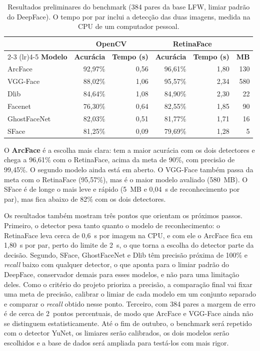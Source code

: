 \documentclass[
    12pt,
    oneside,
    a4paper,
    article,
    english,
    brazil
    ]{abntex2}
\begin{document}
\begin{table}[H]
\centering
\caption{Resultados preliminares do benchmark (384 pares da base LFW, limiar padrão do DeepFace). O tempo por par inclui a detecção das duas imagens, medida na CPU de um computador pessoal.}
\label{tab:benchmark}
\begin{tabular}{lrrrrr}
    \toprule
     & \multicolumn{2}{c}{\textbf{OpenCV}} & \multicolumn{2}{c}{\textbf{RetinaFace}} & \\
    \cmidrule(lr){2-3} \cmidrule(lr){4-5}
    \textbf{Modelo} & \textbf{Acurácia} & \textbf{Tempo (s)} & \textbf{Acurácia} & \textbf{Tempo (s)} & \textbf{MB} \\
    \midrule
    ArcFace      & 92,97\% & 0,56 & 96,61\% & 1,80 & 130 \\
    VGG-Face     & 88,02\% & 1,06 & 95,57\% & 2,34 & 580 \\
    Dlib         & 84,64\% & 1,08 & 84,90\% & 2,30 & 22 \\
    Facenet      & 76,30\% & 0,64 & 82,55\% & 1,85 & 90 \\
    GhostFaceNet & 82,03\% & 0,51 & 81,77\% & 1,71 & 16 \\
    SFace        & 81,25\% & 0,09 & 79,69\% & 1,28 & 5 \\
    \bottomrule
\end{tabular}
\end{table}

O \textbf{ArcFace} é a escolha mais clara: tem a maior acurácia com os dois
detectores e chega a 96,61\% com o RetinaFace, acima da meta de 90\%, com
precisão de 99,45\%. O segundo modelo ainda está em aberto. O VGG-Face também
passa da meta com o RetinaFace (95,57\%), mas é o maior modelo avaliado
(580~MB). O SFace é de longe o mais leve e rápido (5~MB e 0,04~s de
reconhecimento por par), mas fica abaixo de 82\% com os dois detectores.

Os resultados também mostram três pontos que orientam os próximos passos.
Primeiro, o detector pesa tanto quanto o modelo de reconhecimento: o
RetinaFace leva cerca de 0,6~s por imagem na CPU, e com ele o ArcFace fica em
1,80~s por par, perto do limite de 2~s, o que torna a escolha do detector
parte da decisão. Segundo, SFace, GhostFaceNet e Dlib têm precisão próxima de
100\% e \textit{recall} baixo com qualquer detector, o que aponta para o
limiar padrão do DeepFace, conservador demais para esses modelos, e não para
uma limitação deles. Como o critério do projeto prioriza a precisão, a
comparação final vai fixar uma meta de precisão, calibrar o limiar de cada
modelo em um conjunto separado e comparar o \textit{recall} obtido nesse
ponto. Terceiro, com 384 pares a margem de erro é de cerca de 2~pontos
percentuais, de modo que ArcFace e VGG-Face ainda não se distinguem
estatisticamente. Até o fim de outubro, o benchmark será repetido com o
detector YuNet, os limiares serão calibrados, os dois modelos serão escolhidos
e a base de dados será ampliada para testá-los com mais rigor.
\end{document}
